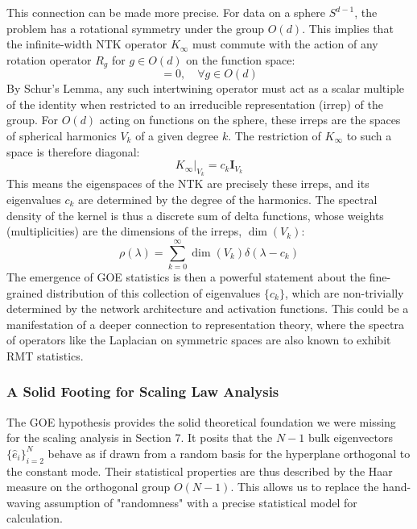 \documentclass[a4paper]{article}
\begin{document}
This connection can be made more precise. For data on a sphere $S^{d-1}$, the problem has a rotational symmetry under the group $O(d)$. This implies that the infinite-width NTK operator $K_\infty$ must commute with the action of any rotation operator $R_g$ for $g \in O(d)$ on the function space:
\begin{equation}
[K_\infty, R_g] = 0, \quad \forall g \in O(d)
\end{equation}
By Schur's Lemma, any such intertwining operator must act as a scalar multiple of the identity when restricted to an irreducible representation (irrep) of the group. For $O(d)$ acting on functions on the sphere, these irreps are the spaces of spherical harmonics $V_k$ of a given degree $k$. The restriction of $K_\infty$ to such a space is therefore diagonal:
\begin{equation}
K_\infty|_{V_k} = c_k \mathbf{I}_{V_k}
\end{equation}
This means the eigenspaces of the NTK are precisely these irreps, and its eigenvalues $c_k$ are determined by the degree of the harmonics. The spectral density of the kernel is thus a discrete sum of delta functions, whose weights (multiplicities) are the dimensions of the irreps, $\dim(V_k)$:
\begin{equation}
\rho(\lambda) = \sum_{k=0}^\infty \dim(V_k) \delta(\lambda - c_k)
\end{equation}
The emergence of GOE statistics is then a powerful statement about the fine-grained distribution of this collection of eigenvalues $\{c_k\}$, which are non-trivially determined by the network architecture and activation functions. This could be a manifestation of a deeper connection to representation theory, where the spectra of operators like the Laplacian on symmetric spaces are also known to exhibit RMT statistics.

\subsubsection{A Solid Footing for Scaling Law Analysis}
The GOE hypothesis provides the solid theoretical foundation we were missing for the scaling analysis in Section 7. It posits that the $N-1$ bulk eigenvectors $\{\hat{e}_i\}_{i=2}^N$ behave as if drawn from a random basis for the hyperplane orthogonal to the constant mode. Their statistical properties are thus described by the Haar measure on the orthogonal group $O(N-1)$. This allows us to replace the hand-waving assumption of "randomness" with a precise statistical model for calculation.
\end{document}
